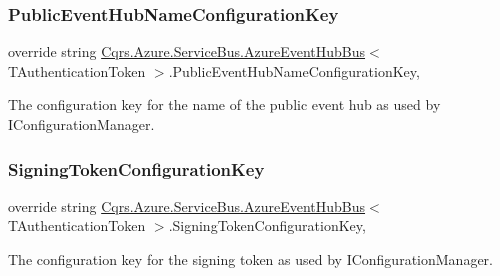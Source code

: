 \subsubsection{\texorpdfstring{Public\+Event\+Hub\+Name\+Configuration\+Key}{PublicEventHubNameConfigurationKey}}
{\footnotesize\ttfamily override string \hyperlink{classCqrs_1_1Azure_1_1ServiceBus_1_1AzureEventHubBus}{Cqrs.\+Azure.\+Service\+Bus.\+Azure\+Event\+Hub\+Bus}$<$ T\+Authentication\+Token $>$.Public\+Event\+Hub\+Name\+Configuration\+Key\hspace{0.3cm}{\ttfamily [get]}, {\ttfamily [protected]}}



The configuration key for the name of the public event hub as used by I\+Configuration\+Manager. 

\mbox{\label{classCqrs_1_1Azure_1_1ServiceBus_1_1AzureEventHubBus_ae0c61b32cf3f7f12fc975a12f077eaf1_ae0c61b32cf3f7f12fc975a12f077eaf1}} 
\subsubsection{\texorpdfstring{Signing\+Token\+Configuration\+Key}{SigningTokenConfigurationKey}}
{\footnotesize\ttfamily override string \hyperlink{classCqrs_1_1Azure_1_1ServiceBus_1_1AzureEventHubBus}{Cqrs.\+Azure.\+Service\+Bus.\+Azure\+Event\+Hub\+Bus}$<$ T\+Authentication\+Token $>$.Signing\+Token\+Configuration\+Key\hspace{0.3cm}{\ttfamily [get]}, {\ttfamily [protected]}}



The configuration key for the signing token as used by I\+Configuration\+Manager. 

